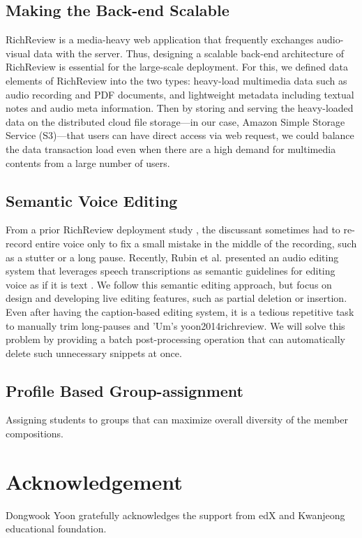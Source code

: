 \documentclass{sigchi}
\begin{document}
\subsection{Making the Back-end Scalable}
RichReview is a media-heavy web application that frequently exchanges audio-visual data with the server.
Thus, designing a scalable back-end architecture of RichReview is essential for the large-scale deployment.
For this, we defined data elements of RichReview into the two types: heavy-load multimedia data such as audio recording and PDF documents, and lightweight metadata including textual notes and audio meta information.
Then by storing and serving the heavy-loaded data on the distributed cloud file storage---in our case, Amazon Simple Storage Service (S3)---that users can have direct access via web request, we could balance the data transaction load even when there are a high demand for multimedia contents from a large number of users.

\subsection{Semantic Voice Editing}
From a prior RichReview deployment study \cite{yoon2015richreview}, the discussant sometimes had to re-record entire voice only to fix a small mistake in the middle of the recording, such as a stutter or a long pause.
Recently, Rubin et al. presented an audio editing system that leverages speech transcriptions as semantic guidelines for editing voice as if it is text \cite{rubin2013content}.
We follow this semantic editing approach, but focus on design and developing live editing features, such as partial deletion or insertion.
Even after having the caption-based editing system, it is a tedious repetitive task to manually trim long-pauses and 'Um's {yoon2014richreview}.
We will solve this problem by providing a batch post-processing operation that can automatically delete such unnecessary snippets at once.

\subsection{Profile Based Group-assignment}
Assigning students to groups that can maximize overall diversity of the member compositions.

\section{Acknowledgement} 
Dongwook Yoon gratefully acknowledges the support from edX and Kwanjeong educational foundation.




\end{document}
